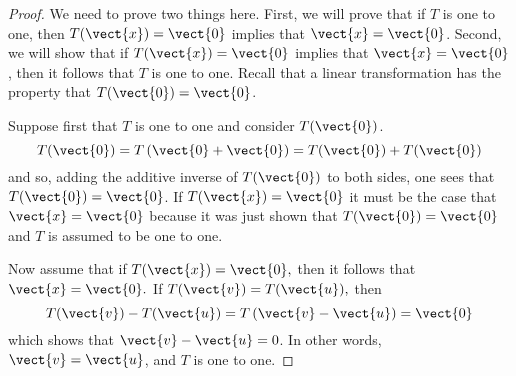 \begin{proof}
We need to prove two things here. First, we will prove that if $T$ is one to one, then 
$T(\vect{x}) = \vect{0}$ implies that $\vect{x}=\vect{0}$. Second, we will show that if $T(\vect{x})=\vect{0}$ implies that $\vect{x}=\vect{0}$, then 
it follows that $T$ is one to one. Recall that a linear transformation has the property that $T(\vect{0}) = \vect{0}$. 


Suppose first that $T$ is one to one and consider $T(\vect{0})$. 
\begin{equation*}
T(\vect{0})=T\left( \vect{0}+\vect{0}\right) =T(\vect{0})+T(\vect{0})
\end{equation*}
and so, adding the additive inverse of $T(\vect{0})$ to both sides, one sees
that $T(\vect{0})=\vect{0}$. If $T(\vect{x})=\vect{0}$ it must be the
case that $\vect{x}=\vect{0}$ because it was just shown that $T(\vect{0})=\vect{0}$ and $T$ is assumed to be one to one. 

Now assume that if $T(\vect{x})=\vect{0},$ then it follows that $\vect{x}=\vect{0}.$ If $T(\vect{v})=T(\vect{u}),$ then 
\[
T(\vect{v})-T(\vect{u})=T\left( \vect{v}-\vect{u}\right) =\vect{0}
\]
which shows that $\vect{v}-\vect{u}=0$. In other words, $\vect{v}=\vect{u}$, and $T$ is one to one. 
\end{proof}

